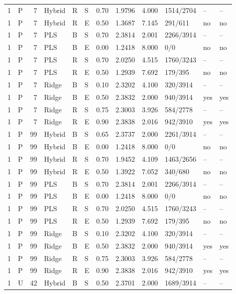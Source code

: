 \documentclass[10pt,a4paper]{article}
\begin{document}
\begin{landscape}
\begin{longtable}{rlrlllrrrlll}
1 & P & 7 & Hybrid & R & S & 0.70 & 1.9796 & 4.000 & 1514/2704 & -- & -- \\
1 & P & 7 & Hybrid & R & E & 0.50 & 1.3687 & 7.145 & 291/611 & no & no \\
1 & P & 7 & PLS & B & S & 0.70 & 2.3814 & 2.001 & 2266/3914 & -- & -- \\
1 & P & 7 & PLS & B & E & 0.00 & 1.2418 & 8.000 & 0/0 & no & no \\
1 & P & 7 & PLS & R & S & 0.70 & 2.0250 & 4.515 & 1760/3243 & -- & -- \\
1 & P & 7 & PLS & R & E & 0.50 & 1.2939 & 7.692 & 179/395 & no & no \\
1 & P & 7 & Ridge & B & S & 0.10 & 2.3202 & 4.100 & 320/3914 & -- & -- \\
1 & P & 7 & Ridge & B & E & 0.50 & 2.3832 & 2.000 & 940/3914 & yes & yes \\
1 & P & 7 & Ridge & R & S & 0.75 & 2.3003 & 3.926 & 584/2778 & -- & -- \\
1 & P & 7 & Ridge & R & E & 0.90 & 2.3838 & 2.016 & 942/3910 & yes & yes \\
1 & P & 99 & Hybrid & B & S & 0.65 & 2.3737 & 2.000 & 2261/3914 & -- & -- \\
1 & P & 99 & Hybrid & B & E & 0.00 & 1.2418 & 8.000 & 0/0 & no & no \\
1 & P & 99 & Hybrid & R & S & 0.70 & 1.9452 & 4.109 & 1463/2656 & -- & -- \\
1 & P & 99 & Hybrid & R & E & 0.50 & 1.3922 & 7.052 & 340/680 & no & no \\
1 & P & 99 & PLS & B & S & 0.70 & 2.3814 & 2.001 & 2266/3914 & -- & -- \\
1 & P & 99 & PLS & B & E & 0.00 & 1.2418 & 8.000 & 0/0 & no & no \\
1 & P & 99 & PLS & R & S & 0.70 & 2.0250 & 4.515 & 1760/3243 & -- & -- \\
1 & P & 99 & PLS & R & E & 0.50 & 1.2939 & 7.692 & 179/395 & no & no \\
1 & P & 99 & Ridge & B & S & 0.10 & 2.3202 & 4.100 & 320/3914 & -- & -- \\
1 & P & 99 & Ridge & B & E & 0.50 & 2.3832 & 2.000 & 940/3914 & yes & yes \\
1 & P & 99 & Ridge & R & S & 0.75 & 2.3003 & 3.926 & 584/2778 & -- & -- \\
1 & P & 99 & Ridge & R & E & 0.90 & 2.3838 & 2.016 & 942/3910 & yes & yes \\
1 & U & 42 & Hybrid & B & S & 0.50 & 2.3701 & 2.000 & 1689/3914 & -- & -- \\

\end{longtable}
\end{landscape}
\end{document}
